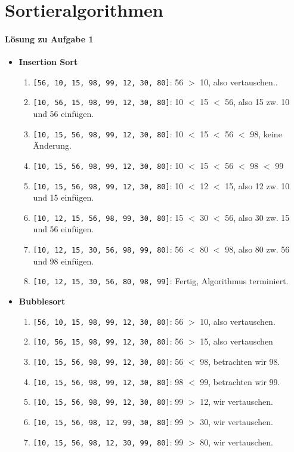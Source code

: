 \documentclass[11pt,a4paper]{scrartcl}
\begin{document}
\section{Sortieralgorithmen}
\paragraph{Lösung zu Aufgabe 1}
\label{a3.1:lsg}
\begin{itemize}
\item \textbf{Insertion Sort}
\begin{enumerate}
\item \texttt{[56, 10, 15, 98, 99, 12, 30, 80]}: 56 $>$ 10, also vertauschen..
\item \texttt{[10, 56, 15, 98, 99, 12, 30, 80]}: 10 $<$ 15 $<$ 56, also 15 zw. 10 und 56 einfügen.
\item \texttt{[10, 15, 56, 98, 99, 12, 30, 80]}: 10 $<$ 15 $<$ 56 $<$ 98, keine Änderung.
\item \texttt{[10, 15, 56, 98, 99, 12, 30, 80]}: 10 $<$ 15 $<$ 56 $<$ 98 $<$ 99
\item \texttt{[10, 15, 56, 98, 99, 12, 30, 80]}: 10 $<$ 12 $<$ 15, also 12 zw. 10 und 15 einfügen.
\item \texttt{[10, 12, 15, 56, 98, 99, 30, 80]}: 15 $<$ 30 $<$ 56, also 30 zw. 15 und 56 einfügen.
\item \texttt{[10, 12, 15, 30, 56, 98, 99, 80]}: 56 $<$ 80 $<$ 98, also 80 zw. 56 und 98 einfügen.
\item \texttt{[10, 12, 15, 30, 56, 80, 98, 99]}: Fertig, Algorithmus terminiert.
\end{enumerate}
\item \textbf{Bubblesort}
\begin{enumerate}
\item \texttt{[56, 10, 15, 98, 99, 12, 30, 80]}: 56 $>$ 10, also vertauschen.
\item \texttt{[10, 56, 15, 98, 99, 12, 30, 80]}: 56 $>$ 15, also vertauschen
\item \texttt{[10, 15, 56, 98, 99, 12, 30, 80]}: 56 $<$ 98, betrachten wir 98.
\item \texttt{[10, 15, 56, 98, 99, 12, 30, 80]}: 98 $<$ 99, betrachten wir 99.
\item \texttt{[10, 15, 56, 98, 99, 12, 30, 80]}: 99 $>$ 12, wir vertauschen.
\item \texttt{[10, 15, 56, 98, 12, 99, 30, 80]}: 99 $>$ 30, wir vertauschen.
\item \texttt{[10, 15, 56, 98, 12, 30, 99, 80]}: 99 $>$ 80, wir vertauschen.

\end{enumerate}
\end{itemize}
\end{document}
